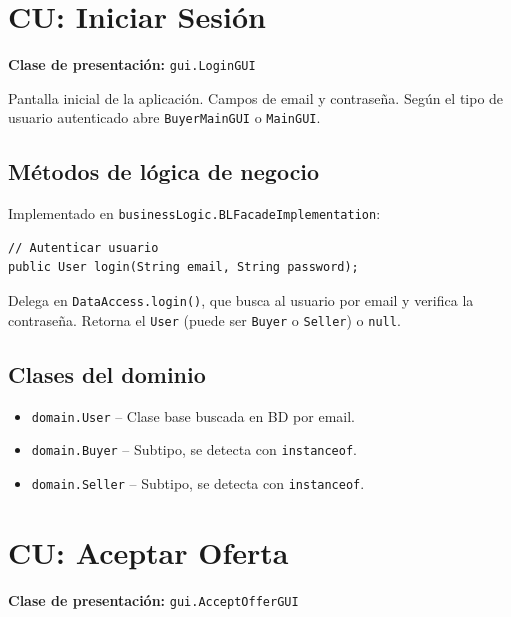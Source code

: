 \documentclass[12pt,a4paper]{article}
\begin{document}
\section{CU: Iniciar Sesión}

\textbf{Clase de presentación:} \texttt{gui.LoginGUI}

Pantalla inicial de la aplicación. Campos de email y contraseña. Según el tipo de usuario autenticado abre \texttt{BuyerMainGUI} o \texttt{MainGUI}.

\subsection{Métodos de lógica de negocio}

Implementado en \texttt{businessLogic.BLFacadeImplementation}:

\begin{lstlisting}
// Autenticar usuario
public User login(String email, String password);
\end{lstlisting}

Delega en \texttt{DataAccess.login()}, que busca al usuario por email y verifica la contraseña. Retorna el \texttt{User} (puede ser \texttt{Buyer} o \texttt{Seller}) o \texttt{null}.

\subsection{Clases del dominio}

\begin{itemize}
    \item \texttt{domain.User} -- Clase base buscada en BD por email.
    \item \texttt{domain.Buyer} -- Subtipo, se detecta con \texttt{instanceof}.
    \item \texttt{domain.Seller} -- Subtipo, se detecta con \texttt{instanceof}.
\end{itemize}

\section{CU: Aceptar Oferta}

\textbf{Clase de presentación:} \texttt{gui.AcceptOfferGUI}
\end{document}
